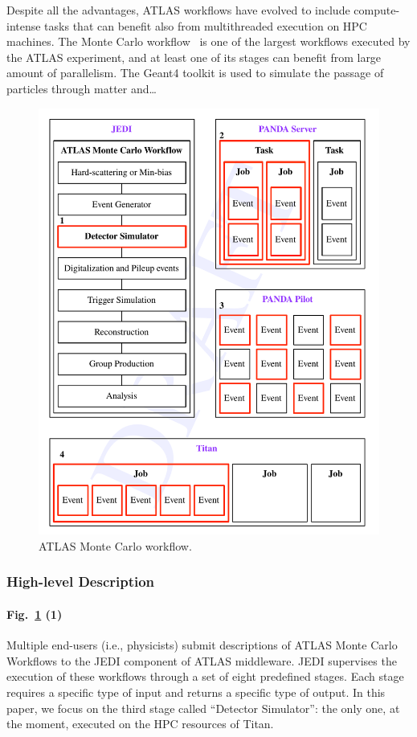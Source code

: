 Despite all the advantages, ATLAS workflows have evolved to include
compute-intense tasks that can benefit also from multithreaded execution on HPC
machines. The Monte Carlo workflow~\cite{} is one of the largest workflows
executed by the ATLAS experiment, and at least one of its stages can benefit
from large amount of parallelism. The Geant4 toolkit is used to simulate the
passage of particles through matter and\ldots

\begin{figure}
  \includegraphics[width=\columnwidth]{figures/atlas_workflow.pdf}
  \caption{ATLAS Monte Carlo workflow.}
\label{fig:atlas_workflow}
\end{figure}

\subsubsection{High-level Description}

\paragraph{Fig.~\ref{fig:atlas_workflow} (1)} Multiple end-users (i.e.,
physicists) submit descriptions of ATLAS Monte Carlo Workflows to the JEDI
component of ATLAS middleware. JEDI supervises the execution of these workflows
through a set of eight predefined stages. Each stage requires a specific type of
input and returns a specific type of output. In this paper, we focus on the
third stage called ``Detector Simulator'': the only one, at the moment, executed
on the HPC resources of Titan.

